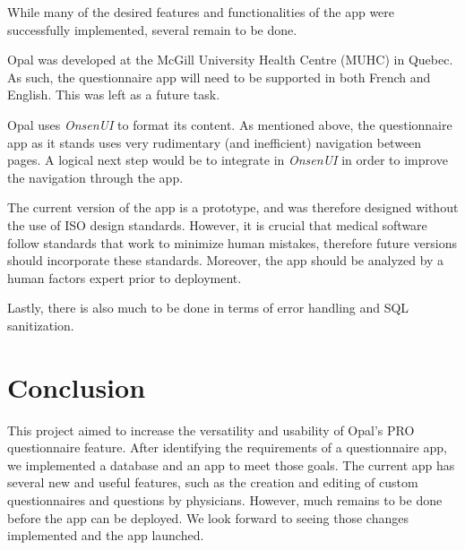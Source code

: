 \documentclass{higrep}
\begin{document}
While many of the desired features and functionalities of the app were successfully implemented, several remain to be done.

Opal was developed at the McGill University Health Centre (MUHC) in Quebec. As such, the questionnaire app will need to be supported in both French and English. This was left as a future task.

Opal uses \textit{OnsenUI} to format its content. As mentioned above, the questionnaire app as it stands uses very rudimentary (and inefficient) navigation between pages. A logical next step would be to integrate in \textit{OnsenUI} in order to improve the navigation through the app.

The current version of the app is a prototype, and was therefore designed without the use of ISO design standards. However, it is crucial that medical software follow standards that work to minimize human mistakes, therefore future versions should incorporate these standards. Moreover, the app should be analyzed by a human factors expert prior to deployment.

Lastly, there is also much to be done in terms of error handling and SQL sanitization.

\chapter{Conclusion}\label{Sec:Conclusion}

This project aimed to increase the versatility and usability of Opal's PRO questionnaire feature. After identifying the requirements of a questionnaire app, we implemented a database and an app to meet those goals. The current app has several new and useful features, such as the creation and editing of custom questionnaires and questions by physicians. However, much remains to be done before the app can be deployed. We look forward to seeing those changes implemented and the app launched.



\clearpage %


\end{document}
